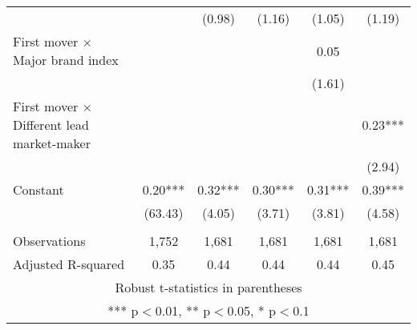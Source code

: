 \documentclass[]{article}
\begin{document}
\begin{tabular}{lccccc}
 &  & (0.98) & (1.16) & (1.05) & (1.19) \\
First mover $\times$ Major brand index &  &  &  & 0.05 &  \\
 &  &  &  & (1.61) &  \\
First mover $\times$ Different lead market-maker &  &  &  &  & 0.23*** \\
 &  &  &  &  & (2.94) \\
Constant & 0.20*** & 0.32*** & 0.30*** & 0.31*** & 0.39*** \\
 & (63.43) & (4.05) & (3.71) & (3.81) & (4.58) \\
 &  &  &  &  &  \\
Observations & 1,752 & 1,681 & 1,681 & 1,681 & 1,681 \\
 Adjusted R-squared & 0.35 & 0.44 & 0.44 & 0.44 & 0.45 \\ \hline
\multicolumn{6}{c}{ Robust t-statistics in parentheses} \\
\multicolumn{6}{c}{ *** p$<$0.01, ** p$<$0.05, * p$<$0.1} \\
\end{tabular}
\end{document}
